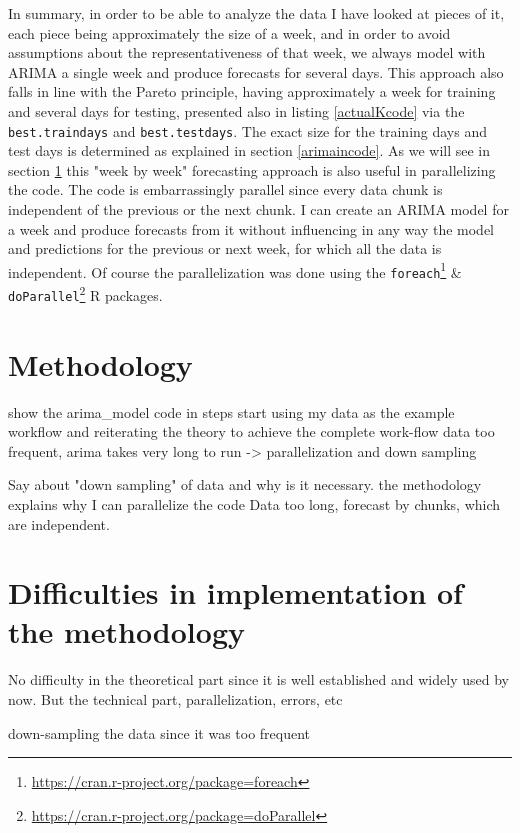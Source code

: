 \documentclass[12pt,a4paper,titlepage]{report}
\begin{document}
In summary, in order to be able to analyze the data I have looked at pieces of it, each piece being approximately the size of a week, and in order to avoid assumptions about the representativeness of that week, we always model with ARIMA a single week and produce forecasts for several days. This approach also falls in line with the Pareto principle, having approximately a week for training and several days for testing, presented also in listing \ref{actualKcode} via the \texttt{best.traindays} and \texttt{best.testdays}. The exact size for the training days and test days is determined as explained in section \ref{arimaincode}. As we will see in section \ref{methodologysection} this "week by week" forecasting approach is also useful in parallelizing the code. The code is embarrassingly parallel since every data chunk is independent of the previous or the next chunk. I can create an ARIMA model for a week and produce forecasts from it without influencing in any way the model and predictions for the previous or next week, for which all the data is independent. Of course the parallelization was done using the \texttt{foreach}\footnote{\url{https://cran.r-project.org/package=foreach}} \& \texttt{doParallel}\footnote{\url{https://cran.r-project.org/package=doParallel}} R packages.

\section{Methodology} \label{methodologysection}

show the arima\_model code in steps
start using my data as the example workflow and reiterating the theory to achieve the complete work-flow
data too frequent, arima takes very long to run -> parallelization and down sampling

Say about "down sampling" of data and why is it necessary.
the methodology explains why I can parallelize the code
Data too long, forecast by chunks, which are independent.


\section{Difficulties in implementation of the methodology}
No difficulty in the theoretical part since it is well established and widely used by now.
But the technical part, parallelization, errors, etc

down-sampling the data since it was too frequent
\end{document}
